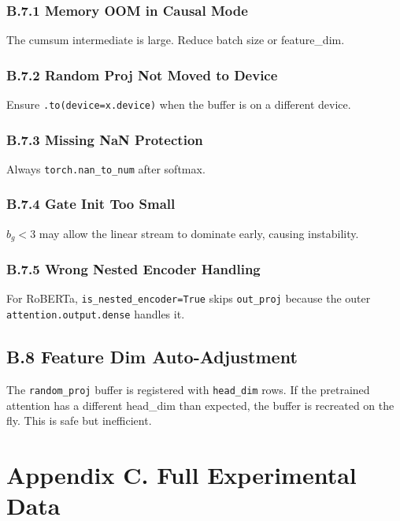 \subsubsection{B.7.1 Memory OOM in Causal Mode}

The cumsum intermediate is large. Reduce batch size or feature\_dim.

\subsubsection{B.7.2 Random Proj Not Moved to Device}

Ensure \texttt{.to(device=x.device)} when the buffer is on a different device.

\subsubsection{B.7.3 Missing NaN Protection}

Always \texttt{torch.nan\_to\_num} after softmax.

\subsubsection{B.7.4 Gate Init Too Small}

$b_g < 3$ may allow the linear stream to dominate early, causing instability.

\subsubsection{B.7.5 Wrong Nested Encoder Handling}

For RoBERTa, \texttt{is\_nested\_encoder=True} skips \texttt{out\_proj} because the outer 
\texttt{attention.output.dense} handles it.

\subsection{B.8 Feature Dim Auto-Adjustment}

The \texttt{random\_proj} buffer is registered with \texttt{head\_dim} rows. If the 
pretrained attention has a different head\_dim than expected, the buffer is 
recreated on the fly. This is safe but inefficient.



\section{Appendix C. Full Experimental Data}

